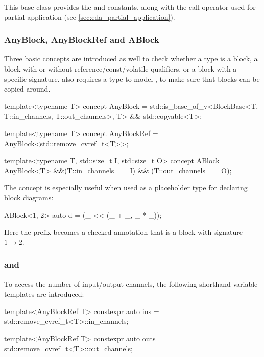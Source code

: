This base class provides the  and  constants, along with the call operator used
for partial application (see \autoref{sec:eda_partial_application}).

\subsubsection{AnyBlock, AnyBlockRef and ABlock}

Three basic concepts are introduced as well to check whether a type  is a block, a
block with or without reference/const/volatile qualifiers, or a block with a specific signature.
 also requires a type to model \footnotemark, to make sure that
blocks can be copied around.


\begin{cppcodenl}
template<typename T>
concept AnyBlock = std::is_base_of_v<BlockBase<T, T::in_channels, T::out_channels>, T> && std::copyable<T>;

template<typename T>
concept AnyBlockRef = AnyBlock<std::remove_cvref_t<T>>;

template<typename T, std::size_t I, std::size_t O>
concept ABlock = AnyBlock<T> &&(T::in_channels == I) && (T::out_channels == O);
\end{cppcodenl}

The  concept is especially useful when used as a placeholder type for declaring block
diagrams:

\begin{cppcodenl}
  ABlock<1, 2> auto d = (_ << (_ + _, _ * _));
\end{cppcodenl}

Here the  prefix becomes a checked annotation that  is a block with signature $1 \rightarrow 2$.

\subsubsection{ and }

To access the number of input/output channels, the following shorthand variable templates are introduced:

\begin{cppcodenl}
template<AnyBlockRef T>
constexpr auto ins = std::remove_cvref_t<T>::in_channels;

template<AnyBlockRef T>
constexpr auto outs = std::remove_cvref_t<T>::out_channels;
\end{cppcodenl}

